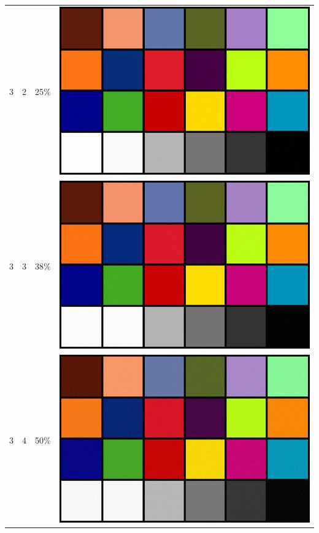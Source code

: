 \documentclass[times, utf8, seminar]{fer}
\begin{document}
\begin{center}
\begin{longtable}{|c|c|c|c|}
3 & 2 &25\% & \includegraphics[scale=0.3]{../benchmark_results/color_chart/3_components-2_bits.png} \\
3 & 3 &38\% & \includegraphics[scale=0.3]{../benchmark_results/color_chart/3_components-3_bits.png} \\
3 & 4 &50\% & \includegraphics[scale=0.3]{../benchmark_results/color_chart/3_components-4_bits.png} \\

\end{longtable}
\end{center}
\end{document}
